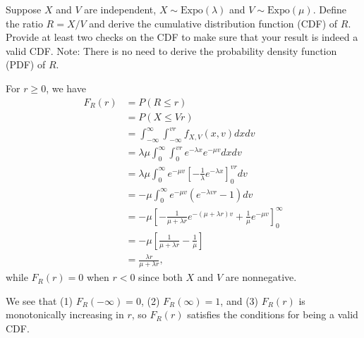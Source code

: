 \begin{exercise}
 Suppose $X$ and $V$ are independent, $X\sim \text{Expo}(\lambda)$ and $V\sim \text{Expo}(\mu)$. Define the ratio $R=X/V$ and derive the cumulative distribution function (CDF) of $R$. Provide at least two checks on the CDF to make sure that your result is indeed a valid CDF.
    Note: There is no need to derive the probability density function (PDF) of $R$.
\begin{solution}
            For $r\geq 0$, we have
            \begin{align*}
                F_{R}(r)& = P(R\leq r) \\
                &= P(X\leq Vr)\\
                & = \int_{-\infty}^{\infty}\int_{-\infty}^{vr}f_{X,V}(x,v)dxdv\\
                & = \lambda\mu \int_{0}^{\infty}\int_{0}^{vr}e^{-\lambda x}e^{-\mu{v}}dxdv\\
                & = \lambda\mu\int_{0}^{\infty}e^{-\mu v}\left[-\frac{1}{\lambda}e^{-\lambda x}\right]_{0}^{vr}dv\\
                & = -\mu \int_{0}^{\infty}e^{-\mu v}(e^{-\lambda vr}-1)dv\\
                & = -\mu\left[-\frac{1}{\mu +\lambda r}e^{-(\mu+\lambda r)v}+\frac{1}{\mu}e^{-\mu v}\right]_{0}^{\infty}\\
                & = -\mu\left[\frac{1}{\mu+\lambda r}-\frac{1}{\mu}\right]\\
                & = \frac{\lambda r}{\mu+\lambda r},
            \end{align*}
            while $F_{R}(r)=0$ when $r<0$ since both $X$ and $V$ are nonnegative.

            We see that (1) $F_{R}(-\infty)=0$, (2) $F_{R}(\infty)=1$, and (3) $F_{R}(r)$ is monotonically increasing in $r$, so $F_{R}(r)$ satisfies the conditions for being a valid CDF.
\end{solution}
\end{exercise}


